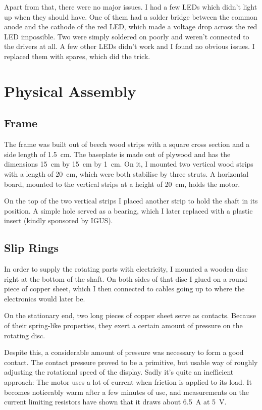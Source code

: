 \documentclass[a4paper, 11pt, titlepage]{report}
\begin{document}
Apart from that, there were no major issues. I had a few LEDs which didn't light up when they
should have. One of them had a solder bridge between the common anode and the cathode of the red
LED, which made a voltage drop across the red LED impossible. Two were simply soldered on poorly
and weren't connected to the drivers at all. A few other LEDs didn't work and I found no obvious
issues. I replaced them with spares, which did the trick.


\section{Physical Assembly}


\subsection{Frame}

The frame was built out of beech wood strips with a square cross section and a side length of
\SI{1.5}{\centi\meter}. The baseplate is made out of plywood and has the dimensions
\SI{15}{\centi\meter} by \SI{15}{\centi\meter} by \SI{1}{\centi\meter}. On it, I mounted two
vertical wood strips with a length of \SI{20}{\centi\meter}, which were both stabilise by three
struts. A horizontal board, mounted to the vertical strips at a height of \SI{20}{\centi\meter},
holds the motor.

On the top of the two vertical strips I placed another strip to hold the shaft in its position.
A simple hole served as a bearing, which I later replaced with a plastic insert (kindly sponsored
by IGUS).


\subsection{Slip Rings}

In order to supply the rotating parts with electricity, I mounted a wooden disc right at the bottom
of the shaft. On both sides of that disc I glued on a round piece of copper sheet, which I then
connected to cables going up to where the electronics would later be.

On the stationary end, two long pieces of copper sheet serve as contacts. Because of their
spring-like properties, they exert a certain amount of pressure on the rotating disc.

Despite this, a considerable amount of pressure was necessary to form a good contact. The contact
pressure proved to be a primitive, but usable way of roughly adjusting the rotational speed of
the display. Sadly it's quite an inefficient approach: The motor uses a lot of current when
friction is applied to its load. It becomes noticeably warm after a few minutes of use, and
measurements on the current limiting resistors have shown that it draws about \SI{6.5}{\ampere} at
\SI{5}{\volt}.
\end{document}
